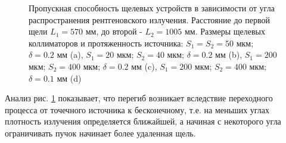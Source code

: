 \begin{figure}[H]
 \centering
 \hfill
 \hfill
 \hfill
 \caption{Пропускная способность щелевых устройств в зависимости от угла распространения
 рентгеновского излучения. Расстояние до первой щели $L_1 = 570$ мм, до второй - $L_2 = 1005 $ мм.
 Размеры щелевых коллиматоров и протяженность источника:
   $S_1 = S_2 = 50$ мкм; $\delta = 0.2$ мм (a),
   $S_1 = 20$ мкм; $S_2 = 40$ мкм; $\delta = 0.2$ мм (b),
   $S_1 = 200$ мкм; $S_2 = 400$ мкм; $\delta = 0.2$ мм (c),
   $S_1 = 200$ мкм; $S_2 = 400$ мкм; $\delta = 0.1$ мм (d)}
 \label{ris:calc_slits_ability_res}
\end{figure}

Анализ рис. \ref{ris:calc_slits_ability_res} показывает, что перегиб  возникает вследствие переходного
процесса от точечного источника к бесконечному, т.е. на меньших углах плотность
излучения определяется ближайшей, а начиная с некоторого угла ограничивать пучок начинает
более удаленная щель.
